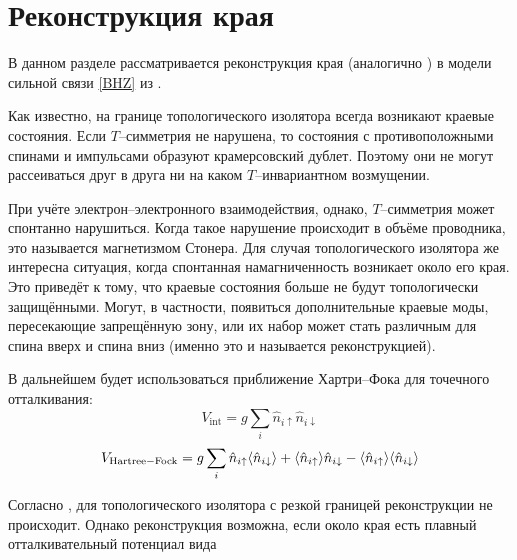 \newpage
\section{Реконструкция края}
В данном разделе рассматривается реконструкция края (аналогично \cite{Wang2017}) 
в модели сильной связи \eqref{BHZ} из \cite{Bernevig2006}.

Как известно, на границе топологического изолятора всегда возникают краевые состояния. Если 
$T$--симметрия не нарушена, то
состояния с противоположными спинами и импульсами образуют крамерсовский дублет. Поэтому они
не могут рассеиваться друг в друга ни на каком $T$--инвариантном возмущении.

При учёте электрон--электронного взаимодействия, однако, $T$--симметрия может спонтанно
нарушиться. Когда такое нарушение происходит в объёме проводника, это называется магнетизмом 
Стонера. Для случая топологического изолятора же интересна ситуация, 
когда спонтанная намагниченность возникает около его края. Это приведёт к тому, что
краевые состояния больше не будут топологически защищёнными. Могут, в частности, появиться
дополнительные краевые моды, пересекающие запрещённую зону, или их набор
может стать различным для спина вверх и спина вниз (именно это и называется
реконструкцией).

В дальнейшем будет использоваться приближение Хартри--Фока для точечного отталкивания:
\begin{equation}
    V_{\mathrm{int}} = g\sum_i \hat{n}_{i\uparrow} \hat{n}_{i\downarrow}
\end{equation}
\begin{equation}
    V_{\mathrm{Hartree-Fock}} = g\sum_i \hat{n}_{i\uparrow} \langle \hat{n}_{i\downarrow}\rangle + 
                               \langle\hat{n}_{i\uparrow}\rangle \hat{n}_{i\downarrow} - 
                               \langle\hat{n}_{i\uparrow}\rangle \langle\hat{n}_{i\downarrow}\rangle 
\end{equation}

Согласно \cite{Wang2017}, для топологического изолятора с резкой границей реконструкции 
не происходит. Однако реконструкция возможна, если около края есть плавный отталкивательный
потенциал вида
\begin{equation}
    
\end{equation}
